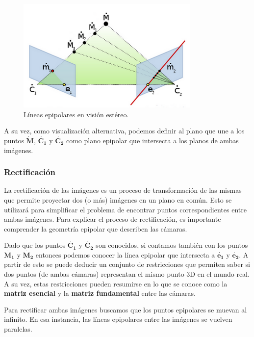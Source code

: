 \documentclass[11pt,a4paper,titlepage]{article}
\newcommand{\TwoCart}[1]{\ensuremath{\mathbf{\dot{#1}}}}
\newcommand{\ThreeCart}[1]{\ensuremath{\mathbf{\dot{#1}}}}
\begin{document}

\begin{figure}[h!]

  \centering
    \includegraphics[width=0.8\textwidth]{f5.png}
  \caption{Líneas epipolares en visión estéreo.}
\end{figure}

A su vez, como visualización alternativa, podemos definir al plano que une a los puntos \ThreeCart{M}, \ThreeCart{C_1} y \ThreeCart{C_2} como plano epipolar que intersecta a los planos de ambas imágenes.

\subsubsection{Rectificación}

La rectificación de las imágenes es un proceso de transformación de las mismas que permite proyectar dos (o más) imágenes en un plano en común. Esto se utilizará para simplificar el problema de encontrar puntos correspondientes entre ambas imágenes. Para explicar el proceso de rectificación, es importante comprender la geometría epipolar que describen las cámaras.

Dado que los puntos \ThreeCart{C_1} y \ThreeCart{C_2} son conocidos, si contamos también con los puntos \ThreeCart{M_1} y \ThreeCart{M_2} entonces podemos conocer la línea epipolar que intersecta a \TwoCart{e_1} y \TwoCart{e_2}. A partir de esto se puede deducir un conjunto de restricciones que permiten saber si dos puntos (de ambas cámaras) representan el mismo punto 3D en el mundo real. A su vez, estas restricciones pueden resumirse en lo que se conoce como la \textbf{matriz esencial} y la \textbf{matriz fundamental} entre las cámaras.

Para rectificar ambas imágenes buscamos que los puntos epipolares se muevan al infinito. En esa instancia, las líneas epipolares entre las imágenes se vuelven paralelas.
\end{document}
